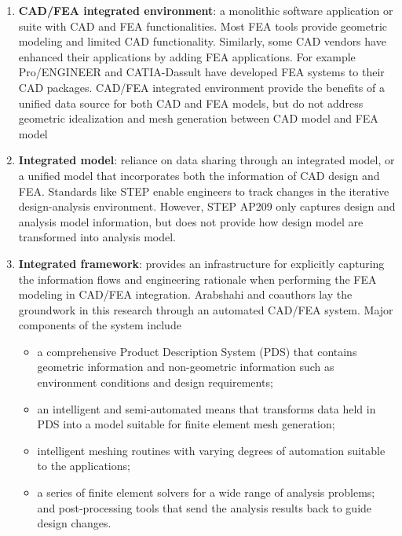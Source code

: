\begin{enumerate}
\item \textbf{CAD/FEA integrated environment}: a monolithic software application or suite with CAD and FEA functionalities.  Most FEA tools provide geometric modeling and limited CAD functionality.    Similarly,  some  CAD  vendors  have  enhanced  their applications  by  adding  FEA  applications.    For  example  Pro/ENGINEER  and  CATIA-Dassult  have  developed  FEA  systems  to  their  CAD  packages.    CAD/FEA  integrated environment provide the benefits of a unified data source for both CAD and FEA models, but  do  not  address  geometric  idealization  and  mesh generation between CAD model and FEA model

\item \textbf{Integrated  model}: reliance on data sharing through an integrated model, or  a  unified  model  that  incorporates  both  the  information  of  CAD  design  and  FEA. Standards like STEP enable engineers to track changes in the iterative design-analysis environment.  However, STEP AP209 only captures design and analysis model information, but does not provide how design model are transformed into analysis model.

\item \textbf{Integrated framework}: provides  an  infrastructure  for  explicitly  capturing  the information  flows  and  engineering  rationale  when  performing  the  FEA  modeling  in CAD/FEA  integration. Arabshahi  and  coauthors  lay  the  groundwork  in  this  research through  an  automated  CAD/FEA  system. Major components of the system include
	\begin{itemize}
		\item a comprehensive Product Description System (PDS) that contains geometric information and non-geometric information such as environment conditions and design requirements;  

		\item an  intelligent  and  semi-automated  means  that  transforms  data  held  in PDS  into  a  model  suitable  for  finite  element  mesh  generation;  

		\item intelligent  meshing routines with varying degrees of automation suitable to the applications; 

		\item a series of finite element solvers for a wide range of analysis problems; and post-processing tools that send the analysis results back to guide design changes.
	\end{itemize}
\end{enumerate}

